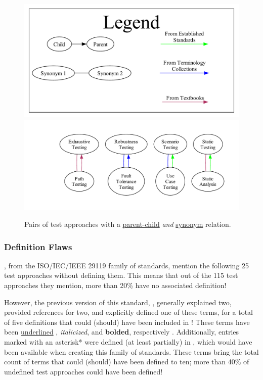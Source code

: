 \ifnotpaper
    \begin{figure}[bt!]
        \centering
        \includegraphics[width=0.48\linewidth]{assets/graphs/manual/expParSynLegend.pdf}
        \includegraphics[width=0.5\linewidth]{assets/graphs/manual/expParSynGraph.pdf}
        \caption{Pairs of test approaches with a \hyperref[par-chd-rels]{parent-child}
            \emph{and} \hyperref[syn-rels]{synonym} relation.}\label{fig:expParSynGraph}
    \end{figure}
\else
\fi

\ifnotpaper
    \subsubsection{Definition Flaws}\label{defs}

    \citet{IEEE2022, IEEE2021a, IEEE2021b}, from the
    ISO/IEC/IEEE 29119 family of standards, mention the following 25 test
    approaches without defining them. This means that out of the 115 test
    approaches they mention, more than 20\% have no associated definition!

    However, the previous version of this standard, \citeyearpar{IEEE2013},
    generally explained two, provided references for two, and explicitly defined
    one of these terms, for a total of five definitions that could (should) have
    been included in \citeyearpar{IEEE2022}! These terms have been
    \underline{underlined}\ifnotpaper%
        , \emph{italicized}, and \textbf{bolded}, respectively%
    \fi. Additionally, entries marked with an asterisk* were defined (at least
    partially) in \citeyearpar{IEEE2017}, which would have been available when
    creating this family of standards. These terms bring the total count of
    terms that could (should) have been defined to ten; more than 40\% of
    undefined test approaches could have been defined!

